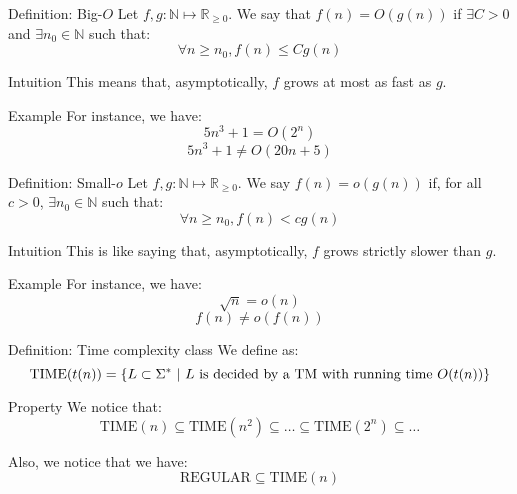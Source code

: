 \documentclass[a4paper]{article}
\begin{document}
\begin{parag}{Definition: Big-$O$}
    Let $f, g: \mathbb{N} \mapsto \mathbb{R}_{\geq 0}$. We say that $f\left(n\right) = O\left(g\left(n\right)\right)$ if $\exists C > 0$ and $\exists n_0 \in \mathbb{N}$ such that: 
    \[\forall n \geq n_0, f\left(n\right) \leq C g\left(n\right)\]
    
    \begin{subparag}{Intuition}
        This means that, asymptotically, $f$ grows at most as fast as $g$.
    \end{subparag}
    

    \begin{subparag}{Example}
        For instance, we have: 
        \[5 n^3 + 1 = O\left(2^n\right)\]
        \[5n^3 + 1 \neq O\left(20n + 5\right)\]
    \end{subparag}
\end{parag}

\begin{parag}{Definition: Small-$o$}
    Let $f, g: \mathbb{N} \mapsto \mathbb{R}_{\geq 0}$. We say $f\left(n\right) = o\left(g\left(n\right)\right)$ if, for all $c > 0$, $\exists n_0 \in \mathbb{N}$ such that: 
    \[\forall n \geq n_0, f\left(n\right) < c g\left(n\right)\]
    
    \begin{subparag}{Intuition}
        This is like saying that, asymptotically, $f$ grows strictly slower than $g$.
    \end{subparag}

    \begin{subparag}{Example}
        For instance, we have: 
        \[\sqrt{n} = o\left(n\right)\]
        \[f\left(n\right) \neq o\left(f\left(n\right)\right)\]
    \end{subparag}
\end{parag}

\begin{parag}{Definition: Time complexity class}
    We define  as: 
    \[\text{TIME}\left(t\left(n\right)\right) = \left\{L \subset \Sigma^* \suchthat L \text{ is decided by a TM with running time $O\left(t\left(n\right)\right)$}\right\}\]
    
    \begin{subparag}{Property}
        We notice that: 
        \[\text{TIME}\left(n\right) \subseteq \text{TIME}\left(n^2\right) \subseteq \ldots \subseteq \text{TIME}\left(2^n\right) \subseteq \ldots\]

        Also, we notice that we have: 
        \[\text{REGULAR} \subseteq \text{TIME}\left(n\right)\]
    \end{subparag}
\end{parag}
\end{document}
